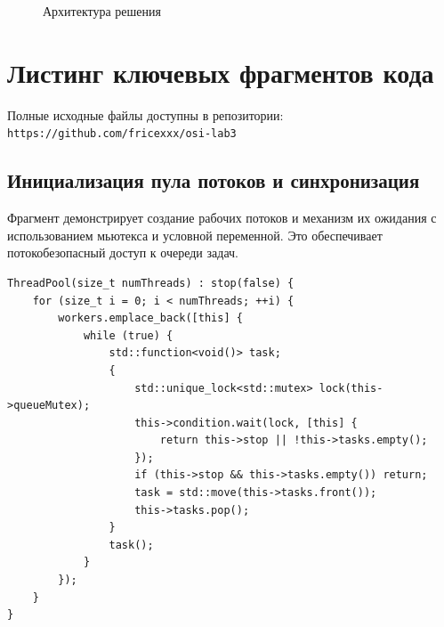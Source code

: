 \documentclass[12pt, a4paper]{article}
\begin{document}
\begin{figure}[H]
    \centering
    \caption{Архитектура решения}
    \label{fig:arch}
\end{figure}

\newpage

\section{Листинг ключевых фрагментов кода}

Полные исходные файлы доступны в репозитории: \texttt{https://github.com/fricexxx/osi-lab3}

\subsection{Инициализация пула потоков и синхронизация}

Фрагмент демонстрирует создание рабочих потоков и механизм их ожидания с использованием мьютекса и условной переменной. Это обеспечивает потокобезопасный доступ к очереди задач.

\begin{lstlisting}[caption={Конструктор ThreadPool и механизм ожидания}, label={lst:pool}]
ThreadPool(size_t numThreads) : stop(false) {
    for (size_t i = 0; i < numThreads; ++i) {
        workers.emplace_back([this] {
            while (true) {
                std::function<void()> task;
                {
                    std::unique_lock<std::mutex> lock(this->queueMutex);
                    this->condition.wait(lock, [this] { 
                        return this->stop || !this->tasks.empty(); 
                    });
                    if (this->stop && this->tasks.empty()) return;
                    task = std::move(this->tasks.front());
                    this->tasks.pop();
                }
                task();
            }
        });
    }
}
\end{lstlisting}

\newpage
\end{document}
